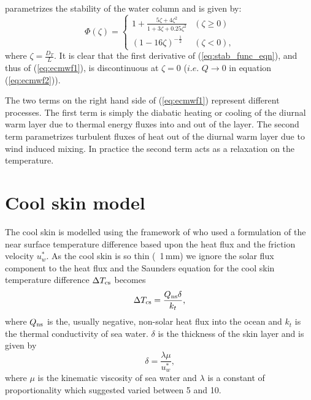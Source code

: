 \documentclass[../tex_main/NEMO_manual]{subfiles}
\begin{document}
parametrizes the stability of the water column and is given by:
\begin{equation}
\Phi(\zeta) = \left\{ \begin{array}{cc} 1 + \frac{5\zeta +
4\zeta^2}{1+3\zeta+0.25\zeta^2} &(\zeta \ge 0) \\
                                    (1 - 16\zeta)^{-\frac{1}{2}} & (\zeta < 0) \mbox{,}
                                    \end{array} \right. \label{eq:stab_func_eqn}
\end{equation}
where $\zeta=\frac{D_T}{L}$.  It is clear that the first derivative of (\autoref{eq:stab_func_eqn}),
and thus of (\autoref{eq:ecmwf1}), is discontinuous at $\zeta=0$ ($i.e.$ $Q\rightarrow0$ in
equation (\autoref{eq:ecmwf2})).

The two terms on the right hand side of (\autoref{eq:ecmwf1}) represent different processes.
The first term is simply the diabatic heating or cooling of the diurnal warm layer due to
thermal energy fluxes into and out of the layer.
The second term parametrizes turbulent fluxes of heat out of the diurnal warm layer due to wind induced mixing.
In practice the second term acts as a relaxation on the temperature.


\section{Cool skin model}
\label{sec:cool_skin_sec}


The cool skin is modelled using the framework of \citet{Saunders_JAS82} who used a formulation of the near surface temperature difference based upon the heat flux and the friction velocity $u^*_{w}$.
As the cool skin is so thin (~1\,mm) we ignore the solar flux component to the heat flux and the Saunders equation for the cool skin temperature difference $\Delta T_{\rm{cs}}$ becomes
\begin{equation}
\label{eq:sunders_eqn}
\Delta T_{\rm{cs}}=\frac{Q_{\rm{ns}}\delta}{k_t} \mbox{,}
\end{equation}
where $Q_{\rm{ns}}$ is the, usually negative, non-solar heat flux into the ocean and
$k_t$ is the thermal conductivity of sea water.
$\delta$ is the thickness of the skin layer and is given by
\begin{equation}
\label{eq:sunders_thick_eqn}
\delta=\frac{\lambda \mu}{u^*_{w}} \mbox{,}
\end{equation}
where $\mu$ is the kinematic viscosity of sea water and $\lambda$ is a constant of proportionality which
\citet{Saunders_JAS82} suggested varied between 5 and 10.
\end{document}
